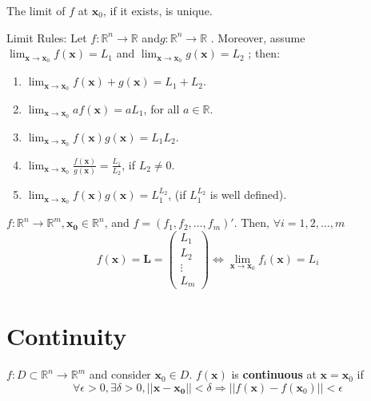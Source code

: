 \begin{proposition}
    The limit of \(f\) at \(\mathbf{x}_0\), if it exists, is unique.
\end{proposition}

Limit Rules: Let \(f:\mathbb{R}^{n}\longrightarrow \mathbb{R}\) and\(g:\mathbb{R}^{n}\longrightarrow \mathbb{R}\) . Moreover, assume \(\lim_{\mathbf{x}\to \mathbf{x}_0}f(\mathbf{x}) = L_1\) and \(\lim_{\mathbf{x}\to \mathbf{x}_0}g(\mathbf{x}) = L_2\) ; then:
\begin{enumerate}
    \item \(\lim_{\mathbf{x}\to \mathbf{x}_0}f(\mathbf{x}) + g(\mathbf{x}) = L_1 + L_2.\)
    \item \(\lim_{\mathbf{x}\to \mathbf{x}_0}a f(\mathbf{x}) = a L_1\), for all \(a\in \mathbb{R}\).
    \item \(\lim_{\mathbf{x}\to \mathbf{x}_0}f(\mathbf{x})g(\mathbf{x}) = L_1L_2\).
    \item \(\lim_{\mathbf{x}\to \mathbf{x}_0}\frac{f(\mathbf{x})}{g(\mathbf{x})} = \frac{L_1}{L_2}\), if \(L_2\neq 0\).
    \item \(\lim_{\mathbf{x}\to \mathbf{x}_0}f(\mathbf{x})g(\mathbf{x}) = L_1^{L_2}\), (if \(L_1^{L_2}\) is well defined).
\end{enumerate}


\begin{proposition}
    \(f: \mathbb{R}^{n} \rightarrow \mathbb{R}^{m}, \mathbf{x_{0}} \in \mathbb{R}^{n}\), and \(f = (f_{1}, f_{2}, \ldots , f_{m})'\). Then, \(\forall i = 1,2, \ldots , m\)
    \[
        f(\mathbf{x}) = \mathbf{L} = \left( \begin{array}{c}L_{1} \\ L_{2} \\ \vdots \\ L_{m} \end{array} \right) \iff \lim_{\mathbf{x} \rightarrow \mathbf{x}_{0}} f_{i}(\mathbf{x}) = L_{i}
    \]
\end{proposition}


\section{Continuity}

\begin{definition}[Continuity]
    \(f: D \subset \mathbb{R}^{n} \rightarrow \mathbb{R}^{m}\) and consider \(\mathbf{x}_{0} \in D\). \(f(\mathbf{x})\) is \textbf{continuous} at \(\mathbf{x} = \mathbf{x}_0\) if \[
        \forall \epsilon > 0, \exists \delta > 0, ||\mathbf{x}-\mathbf{x_0}|| < \delta \Longrightarrow ||f(\mathbf{x}) - f(\mathbf{x}_0)|| < \epsilon
    \]
\end{definition}

